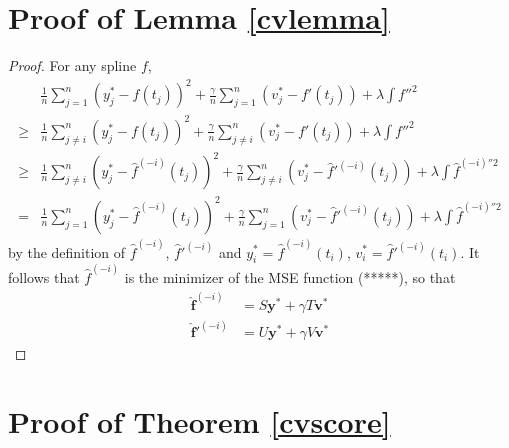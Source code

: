 \section{Proof of Lemma \ref{cvlemma}}
\begin{proof}
For any spline $f$, 
\begin{equation}
\begin{split}
&\frac{1}{n}\sum_{j=1}^{n}(y_j^*-f(t_j))^2+\frac{\gamma}{n} \sum_{j=1}^{n}(v_j^*-f'(t_j))+\lambda\int f''^2 \\
\geq&\frac{1}{n}\sum_{j\neq i}^{n}(y_j^*-f(t_j))^2+\frac{\gamma}{n} \sum_{j\neq i}^{n}(v_j^*-f'(t_j))+\lambda\int f''^2\\
\geq&\frac{1}{n}\sum_{j\neq i}^{n}(y_j^*-\hat{f}^{(-i)}(t_j))^2+\frac{\gamma}{n} \sum_{j\neq i}^{n}(v_j^*-\hat{f}'^{(-i)}(t_j))+\lambda\int \hat{f}^{(-i)''2}\\
=&\frac{1}{n}\sum_{j=1}^{n}(y_j^*-\hat{f}^{(-i)}(t_j))^2+\frac{\gamma}{n} \sum_{j=1}^{n}(v_j^*-\hat{f}'^{(-i)}(t_j))+\lambda\int \hat{f}^{(-i)''2}
\end{split}
\end{equation}
by the definition of $\hat{f}^{(-i)}$, $\hat{f}'^{(-i)}$ and $y_i^*=\hat{f}^{(-i)}(t_i)$, $v_i^*=\hat{f}'^{(-i)}(t_i)$. It follows that $\hat{f}^{(-i)}$ is the minimizer of the MSE function (*****), so that
\begin{align}
\mathbf{\hat{f}}^{(-i)}&=S\mathbf{y}^*+\gamma T\mathbf{v}^*\\
\mathbf{\hat{f}}'^{(-i)}&=U\mathbf{y}^*+\gamma V\mathbf{v}^*
\end{align}
\end{proof}


\section{Proof of Theorem \ref{cvscore}}

